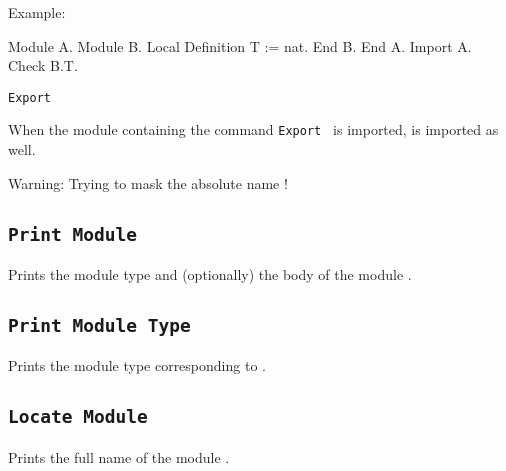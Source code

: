 Example:

\begin{coq_example}
Module A.
Module B.
Local Definition T := nat.
End B.
End A.
Import A.
Check B.T.
\end{coq_example}

\begin{Variants}
\item{\tt Export {\qualid}}

  When the module containing the command {\tt Export {\qualid}} is
  imported, {\qualid} is imported as well.
\end{Variants}

\begin{ErrMsgs}
  \item {}
\end{ErrMsgs}

\begin{Warnings}
  \item Warning: Trying to mask the absolute name {\qualid} !
\end{Warnings}

\subsection{\tt Print Module {\ident}
}

Prints the module type and (optionally) the body of the module {\ident}.

\subsection{\tt Print Module Type {\ident}
}

Prints the module type corresponding to {\ident}.

\subsection{\tt Locate Module {\qualid}
}

Prints the full name of the module {\qualid}.


